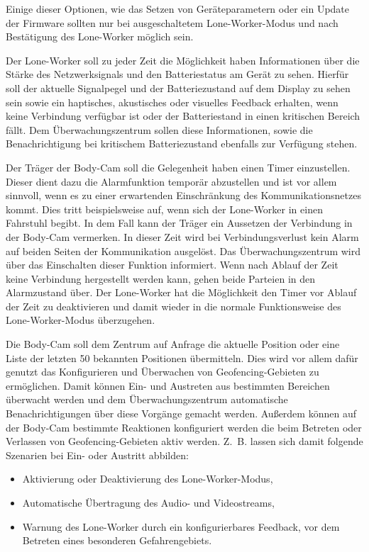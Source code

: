 \documentclass[thesis.tex]{subfiles}
\begin{document}
Einige dieser Optionen, wie das Setzen von Geräteparametern oder ein Update der Firmware sollten nur bei ausgeschaltetem Lone-Worker-Modus und nach Bestätigung des Lone-Worker möglich sein.

Der Lone-Worker soll zu jeder Zeit die Möglichkeit haben Informationen über die Stärke des Netzwerksignals und den Batteriestatus am Gerät zu sehen. %
Hierfür soll der aktuelle Signalpegel und der Batteriezustand auf dem Display zu sehen sein sowie ein haptisches, akustisches oder visuelles Feedback erhalten, wenn keine Verbindung verfügbar ist oder der Batteriestand in einen kritischen Bereich fällt.
Dem Überwachungszentrum sollen diese Informationen, sowie die Benachrichtigung bei kritischem Batteriezustand ebenfalls zur Verfügung stehen.

Der Träger der Body-Cam soll die Gelegenheit haben einen Timer einzustellen.
Dieser dient dazu die Alarmfunktion temporär abzustellen und ist vor allem sinnvoll, wenn es zu einer erwartenden Einschränkung des Kommunikationsnetzes kommt.
Dies tritt beispielsweise auf, wenn sich der Lone-Worker in einen Fahrstuhl begibt.
In dem Fall kann der Träger ein Aussetzen der Verbindung in der Body-Cam vermerken.
In dieser Zeit wird bei Verbindungsverlust kein Alarm auf beiden Seiten der Kommunikation ausgelöst.
Das Überwachungszentrum wird über das Einschalten dieser Funktion informiert.
Wenn nach Ablauf der Zeit keine Verbindung hergestellt werden kann, gehen beide Parteien in den Alarmzustand über.
Der Lone-Worker hat die Möglichkeit den Timer vor Ablauf der Zeit zu deaktivieren und damit wieder in die normale Funktionsweise des Lone-Worker-Modus überzugehen.

Die Body-Cam soll dem Zentrum auf Anfrage die aktuelle Position oder eine Liste der letzten 50 bekannten Positionen übermitteln.
Dies wird vor allem dafür genutzt das Konfigurieren und Überwachen von Geofencing-Gebieten zu ermöglichen.
Damit können Ein- und Austreten aus bestimmten Bereichen überwacht werden und dem Überwachungszentrum automatische Benachrichtigungen
über diese Vorgänge gemacht werden.
Außerdem können auf der Body-Cam bestimmte Reaktionen konfiguriert werden die beim Betreten oder Verlassen von Geofencing-Gebieten aktiv werden.
Z.~B. lassen sich damit folgende Szenarien bei Ein- oder Austritt abbilden:
\begin{itemize}
    \item Aktivierung oder Deaktivierung des Lone-Worker-Modus,
    \item Automatische Übertragung des Audio- und Videostreams,
    \item Warnung des Lone-Worker durch ein konfigurierbares Feedback, vor dem Betreten eines besonderen Gefahrengebiets.
\end{itemize}
\end{document}
